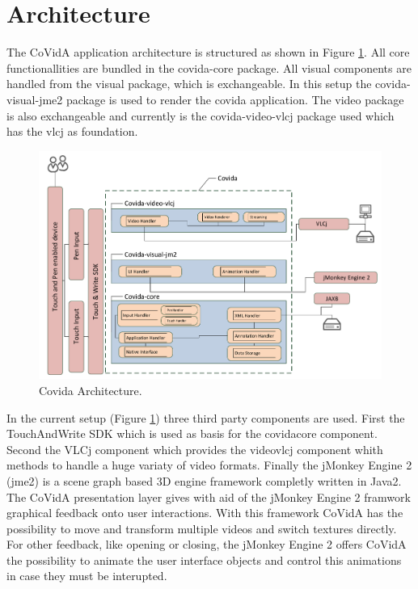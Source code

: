 \section{Architecture}

The CoVidA application architecture is structured as shown in Figure \ref{fig:uml}.
All core functionallities are bundled in the covida-core package.
All visual components are handled from the visual package, which is exchangeable.
In this setup the covida-visual-jme2 package is used to render the covida application.
The video package is also exchangeable and currently is the covida-video-vlcj package used which has the vlcj as foundation.

\begin{figure}[!ht]
\captionsetup{type=figure} 
 \centering
 \includegraphics[width=.85\columnwidth]{architecture}
 \caption{Covida Architecture.}
 \label{fig:uml}
\end{figure}

In the current setup (Figure \ref{fig:uml}) three third party components are used.
First the TouchAndWrite SDK which is used as basis for the covidacore component.
Second the VLCj component which provides the videovlcj component whith methods to handle a huge variaty of video formats.
Finally the jMonkey Engine 2 (jme2) is a scene graph based 3D engine framework completly
written in Java2. The CoVidA presentation layer gives with aid of the jMonkey Engine 2
framwork graphical feedback onto user interactions. With this framework CoVidA has the
possibility to move and transform multiple videos and switch textures directly. For other
feedback, like opening or closing, the jMonkey Engine 2 offers CoVidA the possibility
to animate the user interface objects and control this animations in case they must be
interupted.